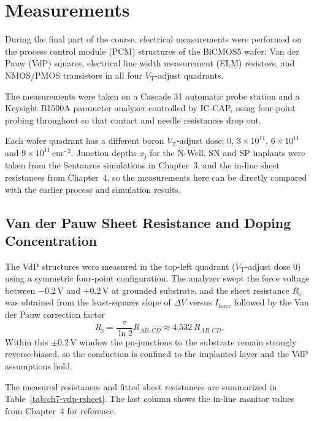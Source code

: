 \section{Measurements}

During the final part of the course, electrical measurements were performed on the process control module (PCM) structures of the BiCMOS5 wafer: Van der Pauw (VdP) squares, electrical line width measurement (ELM) resistors, and NMOS/PMOS transistors in all four $V_\mathrm{T}$-adjust quadrants.

The measurements were taken on a Cascade 31 automatic probe station and a Keysight B1500A parameter analyzer controlled by IC-CAP, using four-point probing throughout so that contact and needle resistances drop out.

Each wafer quadrant has a different boron $V_\mathrm{T}$-adjust dose: $0$, $3\times10^{11}$, $6\times10^{11}$ and $9\times10^{11}\,\mathrm{cm}^{-2}$. Junction depths $x_\mathrm{j}$ for the N-Well, SN and SP implants were taken from the Sentaurus simulations in Chapter~3, and the in-line sheet resistances from Chapter~4, so the measurements here can be directly compared with the earlier process and simulation results.

\subsection{Van der Pauw Sheet Resistance and Doping Concentration}

The VdP structures were measured in the top-left quadrant ($V_\mathrm{T}$-adjust dose $0$) using a symmetric four-point configuration. The analyzer swept the force voltage between $-0.2$\,V and $+0.2$\,V at grounded substrate, and the sheet resistance $R_\mathrm{s}$ was obtained from the least-squares slope of $\Delta V$ versus $I_\mathrm{force}$ followed by the Van der Pauw correction factor
\[
  R_\mathrm{s} = \frac{\pi}{\ln 2} R_{AB,CD} \approx 4.532\,R_{AB,CD}.
\]
Within this $\pm 0.2$\,V window the pn-junctions to the substrate remain strongly reverse-biased, so the conduction is confined to the implanted layer and the VdP assumptions hold.

The measured resistances and fitted sheet resistances are summarized in Table~\ref{tab:ch7-vdp-rsheet}. The last column shows the in-line monitor values from Chapter~4 for reference.

